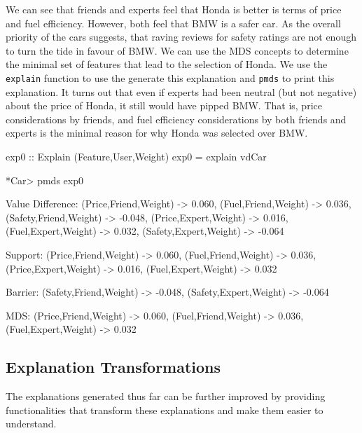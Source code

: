 \documentclass{jfp}
\newcommand{\prog}[1]{\texttt{#1}}
\begin{document}
We can see that friends and experts feel that Honda is better is terms of price and fuel efficiency. However, both feel that BMW is a safer car. As the overall priority of the cars suggests, that raving reviews for safety ratings are not enough to turn the tide in favour of BMW. We can use the MDS concepts to determine the minimal set of features that lead to the selection of Honda. We use the \prog{explain} function to use the generate this explanation and \prog{pmds} to print this explanation. It turns out that even if experts had been neutral (but not negative) about the price of Honda, it still would have pipped BMW. That is, price considerations by friends, and fuel efficiency considerations by both friends and experts is the minimal reason for why Honda was selected over BMW.
\begin{haskellcode}
exp0 :: Explain (Feature,User,Weight) 
exp0 = explain vdCar

*Car> pmds exp0

Value Difference: {(Price,Friend,Weight) -> 0.060,
                   (Fuel,Friend,Weight) -> 0.036,
                   (Safety,Friend,Weight) -> -0.048,
                   (Price,Expert,Weight) -> 0.016,
                   (Fuel,Expert,Weight) -> 0.032,
                   (Safety,Expert,Weight) -> -0.064}

Support: {(Price,Friend,Weight) -> 0.060,
          (Fuel,Friend,Weight) -> 0.036,
          (Price,Expert,Weight) -> 0.016,
          (Fuel,Expert,Weight) -> 0.032}

Barrier: {(Safety,Friend,Weight) -> -0.048,
          (Safety,Expert,Weight) -> -0.064}

MDS: {(Price,Friend,Weight) -> 0.060,
      (Fuel,Friend,Weight) -> 0.036,
      (Fuel,Expert,Weight) -> 0.032}
\end{haskellcode}

\subsection{Explanation Transformations}
The explanations generated thus far can be further improved by providing functionalities that transform these explanations and make them easier to understand.  
\end{document}
